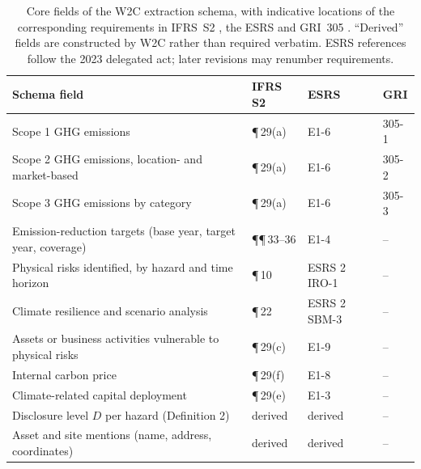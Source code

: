 \documentclass{article}
\theoremstyle{plain}
\theoremstyle{definition}
\begin{document}
\begin{table}[t]
\caption{Core fields of the W2C extraction schema, with indicative locations of the corresponding requirements in IFRS~S2 \citep{ifrs2023s2}, the ESRS \citep{ec2023esrs} and GRI~305 \citep{gri305}. ``Derived'' fields are constructed by W2C rather than required verbatim. ESRS references follow the 2023 delegated act; later revisions may renumber requirements.}
\label{tab:schema}
\centering
\small
\begin{tabularx}{\textwidth}{@{}>{\raggedright\arraybackslash}Xlll@{}}
\toprule
Schema field & IFRS S2 & ESRS & GRI \\
\midrule
Scope 1 GHG emissions & \P\,29(a) & E1-6 & 305-1 \\
Scope 2 GHG emissions, location- and market-based & \P\,29(a) & E1-6 & 305-2 \\
Scope 3 GHG emissions by category & \P\,29(a) & E1-6 & 305-3 \\
Emission-reduction targets (base year, target year, coverage) & \P\P\,33--36 & E1-4 & -- \\
Physical risks identified, by hazard and time horizon & \P\,10 & ESRS 2 IRO-1 & -- \\
Climate resilience and scenario analysis & \P\,22 & ESRS 2 SBM-3 & -- \\
Assets or business activities vulnerable to physical risks & \P\,29(c) & E1-9 & -- \\
Internal carbon price & \P\,29(f) & E1-8 & -- \\
Climate-related capital deployment & \P\,29(e) & E1-3 & -- \\
Disclosure level $D$ per hazard (Definition 2) & derived & derived & -- \\
Asset and site mentions (name, address, coordinates) & derived & derived & -- \\
\bottomrule
\end{tabularx}
\end{table}
\end{document}
